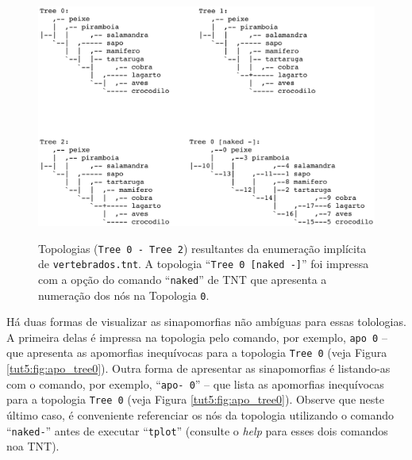 \begin{refsection}
  \begin{figure}[H]
      {\includegraphics[scale=0.80]{figures/tut5/vertebrate_trees.eps}}
	{\caption[Enumeração implícita de \texttt{vertebrados.tnt}]{Topologias (\texttt{Tree 0 - Tree 2}) resultantes da enumeração implícita de \texttt{vertebrados.tnt}. A topologia ``\texttt{Tree 0 [naked -]}'' foi impressa com a opção do comando ``\texttt{naked}'' de TNT que apresenta a numeração dos nós na Topologia \texttt{0}.}\label{tut5:fig:apo_vert}}
  \end{figure}


Há duas formas de visualizar as sinapomorfias não ambíguas para essas tolologias. A primeira delas é impressa na topologia pelo comando, por exemplo, \texttt{apo 0} -- que apresenta as apomorfias inequívocas para a topologia \texttt{Tree 0} (veja Figura \ref{tut5:fig:apo_tree0}). Outra forma de apresentar as sinapomorfias é listando-as com o comando, por exemplo, ``\texttt{apo- 0}'' -- que lista as apomorfias inequívocas para a topologia \texttt{Tree 0} (veja Figura \ref{tut5:fig:apo_tree0}). Observe que neste último caso, é conveniente referenciar os nós da topologia utilizando o comando ``\texttt{naked-}'' antes de executar ``\texttt{tplot}'' (consulte o \textit{help} para esses dois comandos noa TNT).



\end{refsection}
